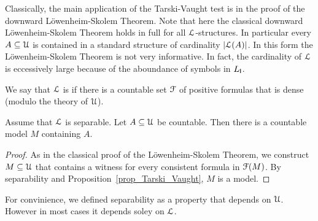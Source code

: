 \documentclass[10pt,oneside]{amsproc}
\newcommand{\mylabel}[1]{{#1}\hfill}
\renewenvironment{itemize}
  {\begin{list}{$\triangleright$}{%
  \setlength{\parskip}{0mm}
  \setlength{\topsep}{.4\baselineskip}
  \setlength{\rightmargin}{0mm}
  \setlength{\listparindent}{0mm}
  \setlength{\itemindent}{0mm}
  \setlength{\labelwidth}{3ex}
  \setlength{\itemsep}{.2\baselineskip}
  \setlength{\parsep}{.2\baselineskip}
  \setlength{\partopsep}{0mm}
  \setlength{\labelsep}{1ex}
  \setlength{\leftmargin}{\labelwidth+\labelsep}
  \let\makelabel\mylabel}}{%
\end{list}}
\renewcommand*{\emph}[1]{%
   \smash{\tikz[baseline]\node[rectangle, fill=teal!25, rounded corners, inner xsep=0.5ex, inner ysep=0.2ex, anchor=base, minimum height = 2.7ex]{\strut #1};}}
\def\existsH{\exists}
\begin{document}
    
   

Classically, the main application of the Tarski-Vaught test is in the proof of the downward L\"owenheim-Skolem Theorem.
Note that here the classical downward L\"owenheim-Skolem Theorem holds in full for all ${\EuScript L}$-structures.
In particular every $A\subseteq{\EuScript U}$ is contained in a standard structure of cardinality $|{\EuScript L}(A)|$.
In this form the L\"owenheim-Skolem Theorem is not very informative.
In fact, the cardinality of ${\EuScript L}$ is eccessively large because of the aboundance of symbols in $L_{\sf I}$.

We say that ${\EuScript L}$ is \emph{separable\/} if there is a countable set  ${\EuScript F}$ of positive formulas that is dense (modulo the theory of ${\EuScript U}$).

\begin{proposition}\label{prop_disjunction_dense}
  Assume that ${\EuScript L}$ is separable.
  Let $A\subseteq{\EuScript U}$ be countable.
  Then there is a countable model $M$ containing $A$. 
\end{proposition}

\begin{proof}
  As in the classical proof of the L\"owenheim-Skolem Theorem,
  we construct $M\subseteq{\EuScript U}$ that contains a witness for every consistent formula in ${\EuScript F}(M)$.
  By separability and Proposition~\ref{prop_Tarski_Vaught}, $M$ is a model.
\end{proof}

For convinience, we defined separability as a property that depends on ${\EuScript U}$.
However in most cases it depends soley on ${\EuScript L}$.
\end{document}
